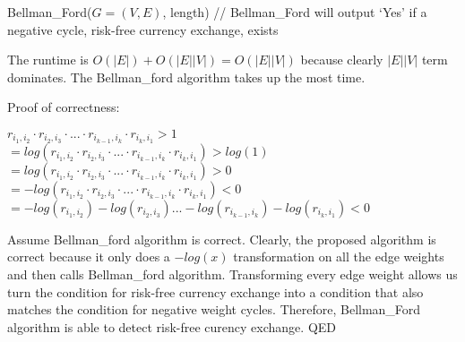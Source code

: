 \documentclass[11pt]{article}
\begin{document}
Bellman\_Ford(\(G=(V,E)\), length) // Bellman\_Ford will output `Yes' if
a negative cycle, risk-free currency exchange, exists

    The runtime is \(O(|E|) + O(|E||V|) = O(|E||V|)\) because clearly
\(|E||V|\) term dominates. The Bellman\_ford algorithm takes up the most
time.

    Proof of correctness:

\(r_{i_{1}, i_{2}} \cdot r_{i_{2}, i_{3}} \cdot... \cdot r_{i_{k-1}, i_{k}} \cdot r_{i_{k}, i_{1}} > 1\)\\
\(=log(r_{i_{1}, i_{2}} \cdot r_{i_{2}, i_{3}} \cdot... \cdot r_{i_{k-1}, i_{k}} \cdot r_{i_{k}, i_{1}}) > log(1)\)\\
\(=log(r_{i_{1}, i_{2}} \cdot r_{i_{2}, i_{3}} \cdot... \cdot r_{i_{k-1}, i_{k}} \cdot r_{i_{k}, i_{1}}) > 0\)\\
\(=-log(r_{i_{1}, i_{2}} \cdot r_{i_{2}, i_{3}} \cdot... \cdot r_{i_{k-1}, i_{k}} \cdot r_{i_{k}, i_{1}}) < 0\)\\
\(=-log(r_{i_{1}, i_{2}})-log(r_{i_{2}, i_{3}})... -log(r_{i_{k-1}, i_{k}})-log(r_{i_{k}, i_{1}}) < 0\)

Assume Bellman\_ford algorithm is correct. Clearly, the proposed
algorithm is correct because it only does a \(-log(x)\) transformation
on all the edge weights and then calls Bellman\_ford algorithm.
Transforming every edge weight allows us turn the condition for
risk-free currency exchange into a condition that also matches the
condition for negative weight cycles. Therefore, Bellman\_Ford algorithm
is able to detect risk-free curency exchange. QED


    
    
    
    
\end{document}
